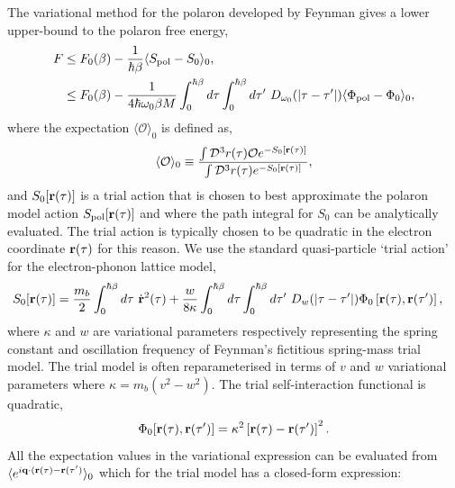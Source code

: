 The variational method for the polaron developed by Feynman gives a lower upper-bound to the polaron free energy,
\begin{equation}
    \begin{aligned}
         F &\leq F_0(\beta) - \frac{1}{\hbar\beta} \langle S_{\text{pol}} - S_{0} \rangle_0 , \\
         &\leq F_0(\beta) -\frac{1}{4\hbar\omega_0\beta M} \int_0^{\hbar\beta} d\tau \int_0^{\hbar\beta} d\tau'\ D_{\omega_0}(\abs{\tau - \tau'}) \langle \Phi_{\text{pol}} - \Phi_0 \rangle_0 ,
    \end{aligned}
\end{equation}
where the expectation $\langle \mathcal{O} \rangle_0$ is defined as,
\begin{equation}
    \langle \mathcal{O} \rangle_0 \equiv \frac{\int \mathcal{D}^3 r(\tau) \mathcal{O} e^{-S_0[\vb{r}(\tau)]}}{\int \mathcal{D}^3 r(\tau) e^{-S_0[\vb{r}(\tau)]}},
\end{equation}
and $S_0[\vb{r}(\tau)]$ is a trial action that is chosen to best approximate the polaron model action $S_{\text{pol}}[\vb{r}(\tau)]$ and where the path integral for $S_0$ can be analytically evaluated. The trial action is typically chosen to be quadratic in the electron coordinate $\vb{r}(\tau)$ for this reason. We use the standard quasi-particle `trial action' for the electron-phonon lattice model, 
\begin{equation}
    \begin{aligned}
        S_{0}[\vb{r}(\tau)] &= \frac{m_b}{2} \int_0^{\hbar\beta} d\tau\ \Dot{\vb{r}}^2(\tau) + \frac{w}{8 \kappa} \int_0^{\hbar\beta} d\tau \int_0^{\hbar\beta} d\tau'\ D_{w}(\abs{\tau - \tau'}) \Phi_0\left[\vb{r}(\tau), \vb{r}(\tau')\right] ,
    \end{aligned}
\end{equation}
where $\kappa$ and $w$ are variational parameters respectively representing the spring constant and oscillation frequency of Feynman's fictitious spring-mass trial model. The trial model is often reparameterised in terms of $v$ and $w$ variational parameters where $\kappa = m_b (v^2 - w^2)$. The trial self-interaction functional is quadratic,
\begin{equation}
    \Phi_0[\vb{r}(\tau), \vb{r}(\tau')] = \kappa^2 \left[\vb{r}(\tau) - \vb{r}(\tau')\right]^2 .
\end{equation}
All the expectation values in the variational expression can be evaluated from $\langle e^{i \vb{q} \cdot (\vb{r}(\tau) - \vb{r}(\tau')} \rangle_0$ which for the trial model has a closed-form expression:
